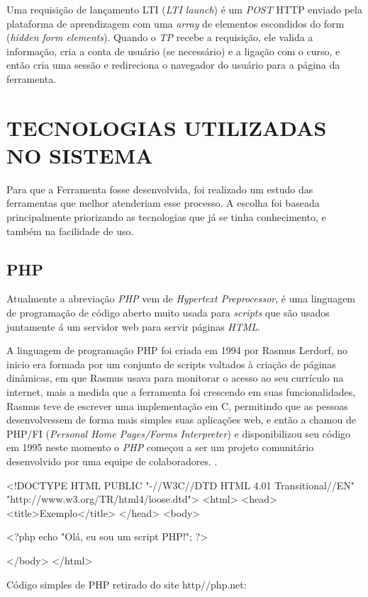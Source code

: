 Uma requisição de lançamento LTI (\textit{LTI launch}) é um \textit{POST} \ac{HTTP} enviado pela plataforma de aprendizagem com uma \textit{array} de elementos escondidos do form (\textit{hidden form elements}). Quando o \textit{TP} recebe a requisição, ele valida a informação, cria a conta de usuário (se necessário) e a ligação com o curso, e então cria uma sessão e redireciona o navegador do usuário para a página da ferramenta.

\chapter{TECNOLOGIAS UTILIZADAS NO SISTEMA}

Para que a Ferramenta fosse desenvolvida, foi realizado um estudo das ferramentas que melhor atenderiam esse processo. A escolha foi baseada principalmente priorizando as tecnologias que já se tinha conhecimento, e também na facilidade de uso.

\section{PHP}
\label{sec:php}

Atualmente a abreviação \textit{PHP} vem de \textit{Hypertext Preprocessor}, é uma linguagem de programação de código aberto muito usada para \textit{scripts} que são usados juntamente á um servidor web para servir páginas \textit{HTML}.

A linguagem de programação PHP foi criada em 1994 por Rasmus Lerdorf, no inicio era formada por um conjunto de scripts voltados à criação de páginas dinâmicas, em que Rasmus usava para monitorar o acesso ao seu currículo na internet, mais a medida que a ferramenta foi crescendo em suas funcionalidades, Rasmus teve de escrever uma implementação em C, permitindo que as pessoas desenvolvessem de forma mais simples suas aplicações web, e então a chamou de PHP/FI (\textit{Personal Home Pages/Forms Interpreter}) e disponibilizou seu código em 1995 neste momento o \textit{PHP} começou a ser um projeto comunitário desenvolvido por uma equipe de colaboradores. \cite[p.~20]{pablo-php}.

\begin{listing}
    \begin{phpcode}
    <!DOCTYPE HTML PUBLIC "-//W3C//DTD HTML 4.01 Transitional//EN"
    "http://www.w3.org/TR/html4/loose.dtd">
    <html>
        <head>
            <title>Exemplo</title>
        </head>
        <body>

        <?php
            echo "Olá, eu sou um script PHP!";
        ?>

        </body>
    </html>
    \end{phpcode}
    \caption{Código simples de PHP retirado do site http//php.net:}
    \label{lst:php_example_1}
\end{listing}

